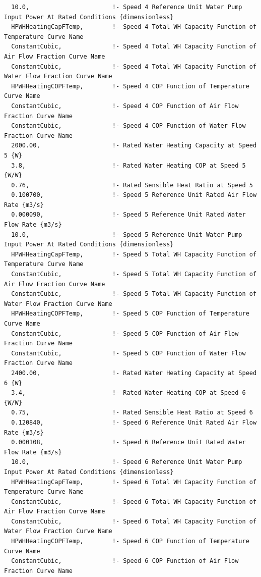 \begin{lstlisting}
  10.0,                       !- Speed 4 Reference Unit Water Pump Input Power At Rated Conditions {dimensionless}
  HPWHHeatingCapFTemp,        !- Speed 4 Total WH Capacity Function of Temperature Curve Name
  ConstantCubic,              !- Speed 4 Total WH Capacity Function of Air Flow Fraction Curve Name
  ConstantCubic,              !- Speed 4 Total WH Capacity Function of Water Flow Fraction Curve Name
  HPWHHeatingCOPFTemp,        !- Speed 4 COP Function of Temperature Curve Name
  ConstantCubic,              !- Speed 4 COP Function of Air Flow Fraction Curve Name
  ConstantCubic,              !- Speed 4 COP Function of Water Flow Fraction Curve Name
  2000.00,                    !- Rated Water Heating Capacity at Speed 5 {W}
  3.8,                        !- Rated Water Heating COP at Speed 5 {W/W}
  0.76,                       !- Rated Sensible Heat Ratio at Speed 5
  0.100700,                   !- Speed 5 Reference Unit Rated Air Flow Rate {m3/s}
  0.000090,                   !- Speed 5 Reference Unit Rated Water Flow Rate {m3/s}
  10.0,                       !- Speed 5 Reference Unit Water Pump Input Power At Rated Conditions {dimensionless}
  HPWHHeatingCapFTemp,        !- Speed 5 Total WH Capacity Function of Temperature Curve Name
  ConstantCubic,              !- Speed 5 Total WH Capacity Function of Air Flow Fraction Curve Name
  ConstantCubic,              !- Speed 5 Total WH Capacity Function of Water Flow Fraction Curve Name
  HPWHHeatingCOPFTemp,        !- Speed 5 COP Function of Temperature Curve Name
  ConstantCubic,              !- Speed 5 COP Function of Air Flow Fraction Curve Name
  ConstantCubic,              !- Speed 5 COP Function of Water Flow Fraction Curve Name
  2400.00,                    !- Rated Water Heating Capacity at Speed 6 {W}
  3.4,                        !- Rated Water Heating COP at Speed 6 {W/W}
  0.75,                       !- Rated Sensible Heat Ratio at Speed 6
  0.120840,                   !- Speed 6 Reference Unit Rated Air Flow Rate {m3/s}
  0.000108,                   !- Speed 6 Reference Unit Rated Water Flow Rate {m3/s}
  10.0,                       !- Speed 6 Reference Unit Water Pump Input Power At Rated Conditions {dimensionless}
  HPWHHeatingCapFTemp,        !- Speed 6 Total WH Capacity Function of Temperature Curve Name
  ConstantCubic,              !- Speed 6 Total WH Capacity Function of Air Flow Fraction Curve Name
  ConstantCubic,              !- Speed 6 Total WH Capacity Function of Water Flow Fraction Curve Name
  HPWHHeatingCOPFTemp,        !- Speed 6 COP Function of Temperature Curve Name
  ConstantCubic,              !- Speed 6 COP Function of Air Flow Fraction Curve Name

\end{lstlisting}
